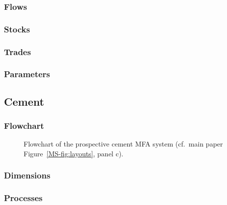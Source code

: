 \subsubsection{Flows}

\subsubsection{Stocks}

\subsubsection{Trades}

\clearpage
\begin{landscape}
\subsubsection{Parameters}
\end{landscape}
\clearpage

\subsection{Cement}

\subsubsection{Flowchart}
\begin{figure}[htbp]
    \centering
    \caption{Flowchart of the prospective cement MFA system (cf.\ main paper Figure~\ref{MS-fig:layouts}, panel c).}
    \label{fig:flowachart_cement}
\end{figure}

\clearpage

\subsubsection{Dimensions}

\subsubsection{Processes}

